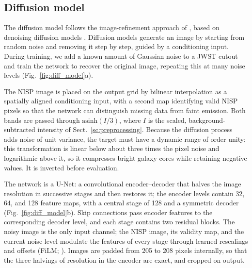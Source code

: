 \documentclass[longauth]{aa}
\begin{document}
\subsection{Diffusion model}
\label{sc:diffusion_model}

The diffusion model follows the image-refinement approach of \citet{SR3}, based on denoising diffusion models \citep{Ho2020, Nichol2021}.
Diffusion models generate an image by starting from random noise and removing it step by step, guided by a conditioning input.
During training, we add a known amount of Gaussian noise to a JWST cutout and train the network to recover the original image, repeating this at many noise levels (Fig.~\ref{fig:diff_model}a).

The NISP image is placed on the output grid by bilinear interpolation as a spatially aligned conditioning input, with a second map identifying valid NISP pixels so that the network can distinguish missing data from faint emission.
Both bands are passed through $\mathrm{asinh}(I/3)$, where $I$ is the scaled, background-subtracted intensity of Sect.~\ref{sc:preprocessing}.
Because the diffusion process adds noise of unit variance, the target must have a dynamic range of order unity; this transformation is linear below about three times the pixel noise and logarithmic above it, so it compresses bright galaxy cores while retaining negative values.
It is inverted before evaluation.

The network is a U-Net: a convolutional encoder--decoder that halves the image resolution in successive stages and then restores it; the encoder levels contain 32, 64, and 128 feature maps, with a central stage of 128 and a symmetric decoder (Fig.~\ref{fig:diff_model}b).
Skip connections pass encoder features to the corresponding decoder level, and each stage contains two residual blocks.
The noisy image is the only input channel; the NISP image, its validity map, and the current noise level modulate the features of every stage through learned rescalings and offsets (FiLM; \citealt{Perez2017}).
Images are padded from 205 to 208 pixels internally, so that the three halvings of resolution in the encoder are exact, and cropped on output.
\end{document}
